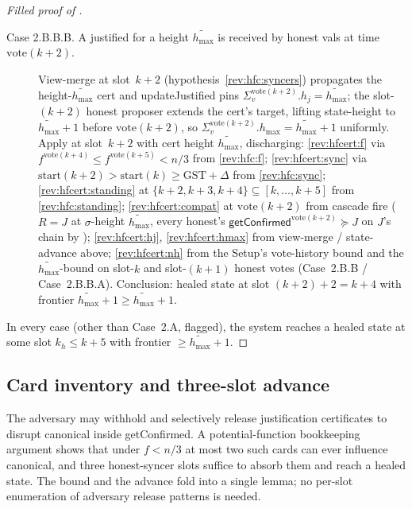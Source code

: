 \documentclass{article}
\newcommand{\hmax}{\ensuremath{h_{\max}}\xspace}
\newcommand{\start}{\ensuremath{\mathrm{start}}}
\newcommand{\vote}{\ensuremath{\mathrm{vote}}}
\newcommand{\GST}{\ensuremath{\mathrm{GST}}\xspace}
\newcommand{\comm}[1]{\ensuremath{\widetilde{#1}}}
\newcommand{\updateJustified}{\textsf{updateJustified}\xspace}
\newcommand{\getConfirmed}{\textsf{getConfirmed}\xspace}
\theoremstyle{plain}
\theoremstyle{definition}
\theoremstyle{remark}
\begin{document}
\begin{proof}[Filled proof of ]
\begin{description}[style=nextline]
\begin{description}[style=nextline]
\begin{description}[style=nextline]
\begin{description}
          \item[Case 2.B.B.B. A justified for a height $\comm{\hmax}$ is received by honest vals at time $\vote(k+2)$.]
            View-merge at slot~$k+2$ (hypothesis~\ref{rev:hfc:syncers}) propagates the height-$\comm{\hmax}$ cert and \updateJustified{} pins $\Sigma_v^{\vote(k+2)}.h_j = \comm{\hmax}$;
            the slot-$(k+2)$ honest proposer extends the cert's target, lifting state-height to $\comm{\hmax}+1$ before $\vote(k+2)$, so $\Sigma_v^{\vote(k+2)}.\hmax = \comm{\hmax}+1$ uniformly.
            Apply  at slot~$k+2$ with cert height $\comm{\hmax}$, discharging:
            \ref{rev:hfcert:f} via $f^{\vote(k+4)} \leq f^{\vote(k+5)} < n/3$ from \ref{rev:hfc:f};
            \ref{rev:hfcert:sync} via $\start(k+2) > \start(k) \geq \GST + \Delta$ from \ref{rev:hfc:sync};
            \ref{rev:hfcert:standing} at $\{k+2, k+3, k+4\} \subseteq [k,\dots,k+5]$ from \ref{rev:hfc:standing};
            \ref{rev:hfcert:compat} at $\vote(k+2)$ from cascade fire ($R = J$ at $\sigma$-height $\comm{\hmax}$, every honest's $\getConfirmed^{\vote(k+2)} \succeq J$ on $J$'s chain by );
            \ref{rev:hfcert:hj}, \ref{rev:hfcert:hmax} from view-merge / state-advance above;
            \ref{rev:hfcert:nh} from the Setup's vote-history bound and the $\comm{\hmax}$-bound on slot-$k$ and slot-$(k+1)$ honest votes (Case~2.B.B / Case~2.B.B.A).
            Conclusion: healed state at slot $(k+2)+2 = k+4$ with frontier $\comm{\hmax}+1 \geq \comm{\hmax}+1$.
        \end{description}
    \end{description}
  \end{description}
\end{description}

In every case (other than Case~2.A, flagged), the system reaches a healed state at some slot $k_h \leq k+5$ with frontier $\geq \comm{\hmax}+1$.
\end{proof}



\subsection{Card inventory and three-slot advance}\label{sec:card-and-advance}

The adversary may withhold and selectively release justification certificates to disrupt canonical inside \getConfirmed{}.
A potential-function bookkeeping argument shows that under $f < n/3$ at most two such cards can ever influence canonical, and three honest-syncer slots suffice to absorb them and reach a healed state.
The bound and the advance fold into a single lemma; no per-slot enumeration of adversary release patterns is needed.
\end{document}
